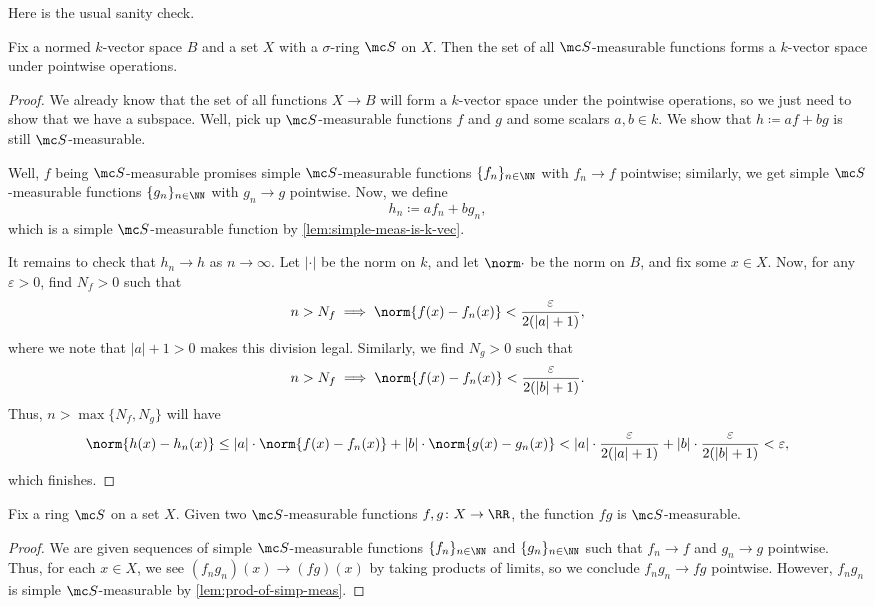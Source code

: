 \documentclass[../notes.tex]{subfiles}
\begin{document}
Here is the usual sanity check.
\begin{lemma} \label{lem:meas-is-vec-space}
	Fix a normed $k$-vector space $B$ and a set $X$ with a $\sigma$-ring $\mc S$ on $X$. Then the set of all $\mc S$-measurable functions forms a $k$-vector space under pointwise operations.
\end{lemma}
\begin{proof}
	We already know that the set of all functions $X\to B$ will form a $k$-vector space under the pointwise operations, so we just need to show that we have a subspace. Well, pick up $\mc S$-measurable functions $f$ and $g$ and some scalars $a,b\in k$. We show that $h\coloneqq af+bg$ is still $\mc S$-measurable.

	Well, $f$ being $\mc S$-measurable promises simple $\mc S$-measurable functions $\{f_n\}_{n\in\NN}$ with $f_n\to f$ pointwise; similarly, we get simple $\mc S$-measurable functions $\{g_n\}_{n\in\NN}$ with $g_n\to g$ pointwise. Now, we define
	\[h_n\coloneqq af_n+bg_n,\]
	which is a simple $\mc S$-measurable function by \autoref{lem:simple-meas-is-k-vec}.

	It remains to check that $h_n\to h$ as $n\to\infty$. Let $|\cdot|$ be the norm on $k$, and let $\norm\cdot$ be the norm on $B$, and fix some $x\in X$. Now, for any $\varepsilon>0$, find $N_f>0$ such that
	\[n>N_f\implies\norm{f(x)-f_n(x)}<\frac\varepsilon{2(|a|+1)},\]
	where we note that $|a|+1>0$ makes this division legal. Similarly, we find $N_g>0$ such that
	\[n>N_f\implies\norm{f(x)-f_n(x)}<\frac\varepsilon{2(|b|+1)}.\]
	Thus, $n>\max\{N_f,N_g\}$ will have
	\[\norm{h(x)-h_n(x)}\le |a|\cdot\norm{f(x)-f_n(x)}+|b|\cdot\norm{g(x)-g_n(x)}<|a|\cdot\frac\varepsilon{2(|a|+1)}+|b|\cdot\frac\varepsilon{2(|b|+1)}<\varepsilon,\]
	which finishes.
\end{proof}
\begin{lemma} \label{lem:prod-of-meas}
	Fix a ring $\mc S$ on a set $X$. Given two $\mc S$-measurable functions $f,g\colon X\to\RR$, the function $fg$ is $\mc S$-measurable.
\end{lemma}
\begin{proof}
	We are given sequences of simple $\mc S$-measurable functions $\{f_n\}_{n\in\NN}$ and $\{g_n\}_{n\in\NN}$ such that $f_n\to f$ and $g_n\to g$ pointwise. Thus, for each $x\in X$, we see $(f_ng_n)(x)\to(fg)(x)$ by taking products of limits, so we conclude $f_ng_n\to fg$ pointwise. However, $f_ng_n$ is simple $\mc S$-measurable by \autoref{lem:prod-of-simp-meas}.
\end{proof}
\end{document}
